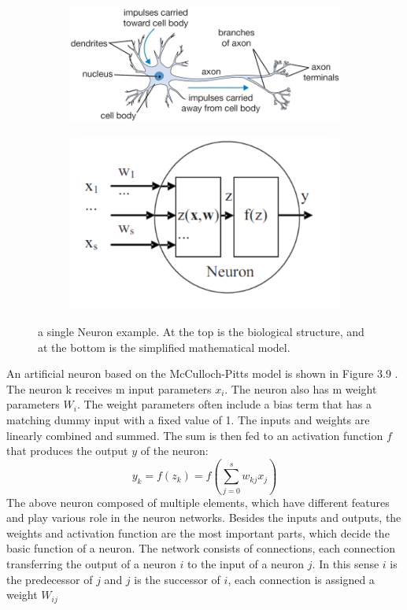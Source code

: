 \begin{figure}[h]
	\centering
	\begin{subfigure}{0.8\textwidth}
		\centering
		\includegraphics[width=0.9\linewidth]{Figures/Section3_NeuroStructure.png} 
	\end{subfigure}
	\begin{subfigure}{0.7\textwidth}
		\centering
		\includegraphics[width=0.7\linewidth]{Figures/Section3_OneNeuron_1.png} 
	\end{subfigure}
	\caption{a single Neuron example. At the top is the biological structure, and at the bottom is the simplified mathematical model.}
	\label{fig:unit of a neuron}
\end{figure}

An artificial neuron based on the McCulloch-Pitts model is shown in Figure 3.9 \cite{bishop2006pattern}. The neuron k receives m input parameters $ x_{i} $. The neuron also has m weight parameters $ W_{i} $. The weight parameters often include a bias term that has a matching dummy input with a fixed value of 1. The inputs and weights are linearly combined and summed. The sum is then fed to an activation function $ f $ that produces the output $ y $ of the neuron:
\begin{equation}
	y_{ k }=f\left( z_{ k } \right)=f\left( \sum_{ j=0 }^{s}{ w_{ kj }x_{ j } } \right)
\end{equation}
The above neuron composed of multiple elements, which have different features and play various role in the neuron networks. Besides the inputs and outputs, the weights and activation function are the most important parts, which decide the basic function of a neuron. The network consists of connections, each connection transferring the output of a neuron $i$ to the input of a neuron $j$. In this sense $i$ is the predecessor of $j$ and $j$ is the successor of $i$, each connection is assigned a weight $W_{ij}$

